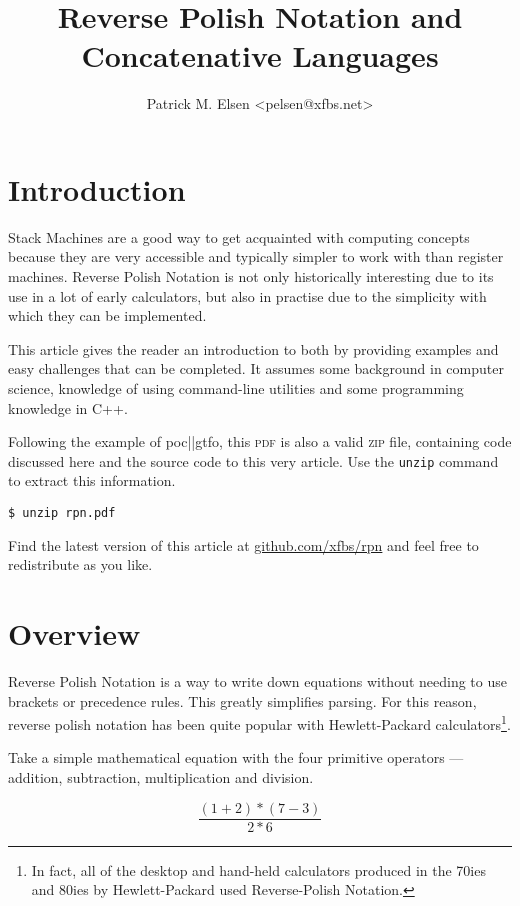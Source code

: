 \documentclass[a4paper,twocolumn]{article}
\title{Reverse Polish Notation and Concatenative Languages}
\author{Patrick M. Elsen <pelsen@xfbs.net>}
\date{}
\begin{document}
\maketitle
\tableofcontents

\section*{Introduction}

Stack Machines are a good way to get acquainted with computing concepts because they are very accessible and typically simpler to work with than register machines. Reverse Polish Notation is not only historically interesting due to its use in a lot of early calculators, but also in practise due to the simplicity with which they can be implemented.

This article gives the reader an introduction to both by providing examples and easy challenges that can be completed. It assumes some background in computer science, knowledge of using command-line utilities and some programming knowledge in C++.

Following the example of  poc||gtfo, this \textsc{pdf} is also a valid \textsc{zip} file, containing code discussed here and the source code to this very article. Use the \verb|unzip| command to extract this information.

\begin{verbatim}
$ unzip rpn.pdf
\end{verbatim}
Find the latest version of this article at \href{https://github.com/xfbs/rpn}{github.com/xfbs/rpn} and feel free to redistribute as you like.

\section{Overview}

Reverse Polish Notation is a way to write down equations without needing to use brackets or precedence rules. This greatly simplifies parsing. For this reason, reverse polish notation has been quite popular with Hewlett-Packard calculators\cite{website:hprpn}\footnote{In fact, all of the desktop and hand-held calculators produced in the 70ies and 80ies by  Hewlett-Packard used Reverse-Polish Notation.}.

Take a simple mathematical equation with the four primitive operators — addition, subtraction, multiplication and division.

\begin{equation}\label{eqn:simpleeqn}
  \frac{(1 + 2) * (7 - 3)}{2 * 6}
\end{equation}
\end{document}
